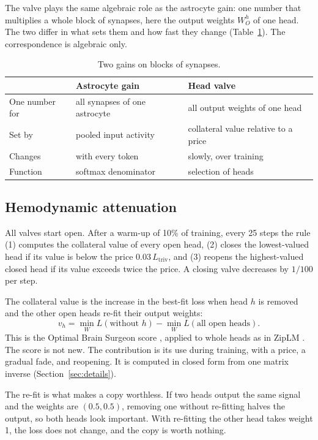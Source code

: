 \documentclass[11pt]{report}
\newcommand{\Ltriv}{L_{\mathrm{triv}}}
\begin{document}
The valve plays the same algebraic role as the astrocyte gain: one number that multiplies a
whole block of synapses, here the output weights $W_O^h$ of one head. The two differ in what
sets them and how fast they change (Table~\ref{tab:astro}). The correspondence is algebraic
only.

\begin{table}[h]
\centering
\small
\begin{tabular}{lll}
\toprule
 & Astrocyte gain \cite{kozachkov2023} & Head valve \\
\midrule
One number for     & all synapses of one astrocyte & all output weights of one head \\
Set by             & pooled input activity         & collateral value relative to a price \\
Changes            & with every token              & slowly, over training \\
Function           & softmax denominator           & selection of heads \\
\bottomrule
\end{tabular}
\caption{Two gains on blocks of synapses.}
\label{tab:astro}
\end{table}

\subsection{Hemodynamic attenuation}
\label{sec:rule}

All valves start open. After a warm-up of 10\% of training, every 25 steps the rule (1) computes
the collateral value of every open head, (2) closes the lowest-valued head if its value is below
the price $0.03\,\Ltriv$, and (3) reopens the highest-valued closed head if its value exceeds twice
the price. A closing valve decreases by $1/100$ per step.

The collateral value is the increase in the best-fit loss when head $h$ is removed and the other
open heads re-fit their output weights:
\begin{equation}
v_h = \min_W L(\text{without } h) - \min_W L(\text{all open heads}).
\end{equation}
This is the Optimal Brain Surgeon score \cite{obs}, applied to whole heads as in ZipLM
\cite{ziplm}. The score is not new. The contribution is its use during training, with a price, a
gradual fade, and reopening. It is computed in closed form from one matrix inverse
(Section~\ref{sec:details}).

The re-fit is what makes a copy worthless. If two heads output the same signal and the weights
are $(0.5, 0.5)$, removing one without re-fitting halves the output, so both heads look
important. With re-fitting the other head takes weight 1, the loss does not change, and the copy
is worth nothing.
\end{document}
